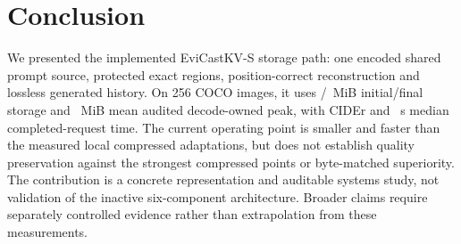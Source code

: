 \section{Conclusion}
\label{sec:conclusion}
We presented the implemented EviCastKV-S storage path: one encoded shared
prompt source, protected exact regions, position-correct reconstruction and
lossless generated history. On 256 COCO images, it uses
\EviInitial/\EviFinal~MiB initial/final storage and \EviPeak~MiB mean
audited decode-owned peak, with \EviCider{} CIDEr and
\EviMedian~s median completed-request time. The current operating point is
smaller and faster than the measured local compressed adaptations, but
does not establish quality preservation against the strongest compressed
points or byte-matched superiority. The contribution is a concrete
representation and auditable systems study, not validation of the
inactive six-component architecture. Broader claims require separately
controlled evidence rather than extrapolation from these measurements.
